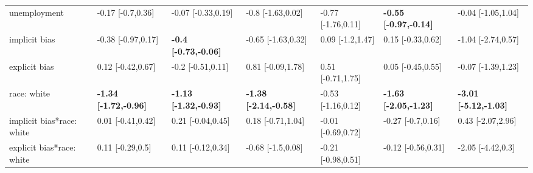 \documentclass[]{article}
\theoremstyle{definition}
\theoremstyle{definition}
\theoremstyle{remark}
\begin{document}
\begin{landscape}
\begin{table}
{\begin{tabular}[t]{lllllll}
unemployment & -0.17 [-0.7,0.36] & -0.07 [-0.33,0.19] & -0.8 [-1.63,0.02] & -0.77 [-1.76,0.11] & \textbf{-0.55 [-0.97,-0.14]} & -0.04 [-1.05,1.04]\\
implicit bias & -0.38 [-0.97,0.17] & \textbf{-0.4 [-0.73,-0.06]} & -0.65 [-1.63,0.32] & 0.09 [-1.2,1.47] & 0.15 [-0.33,0.62] & -1.04 [-2.74,0.57]\\
\addlinespace
explicit bias & 0.12 [-0.42,0.67] & -0.2 [-0.51,0.11] & 0.81 [-0.09,1.78] & 0.51 [-0.71,1.75] & 0.05 [-0.45,0.55] & -0.07 [-1.39,1.23]\\
race: white & \textbf{-1.34 [-1.72,-0.96]} & \textbf{-1.13 [-1.32,-0.93]} & \textbf{-1.38 [-2.14,-0.58]} & -0.53 [-1.16,0.12] & \textbf{-1.63 [-2.05,-1.23]} & \textbf{-3.01 [-5.12,-1.03]}\\
implicit bias*race: white & 0.01 [-0.41,0.42] & 0.21 [-0.04,0.45] & 0.18 [-0.71,1.04] & -0.01 [-0.69,0.72] & -0.27 [-0.7,0.16] & 0.43 [-2.07,2.96]\\
explicit bias*race: white & 0.11 [-0.29,0.5] & 0.11 [-0.12,0.34] & -0.68 [-1.5,0.08] & -0.21 [-0.98,0.51] & -0.12 [-0.56,0.31] & -2.05 [-4.42,0.3]\\
\bottomrule
\end{tabular}}
\end{table}
\end{landscape}
\end{document}
